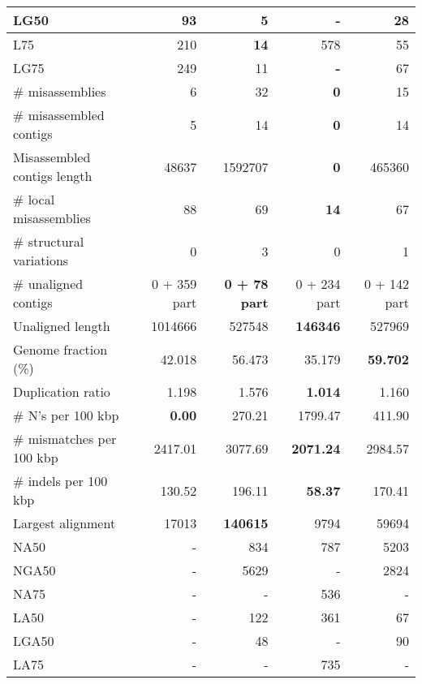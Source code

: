 \documentclass[12pt,a4paper]{article}
\begin{document}
\begin{table}[ht]
\begin{center}
\begin{tabular}{|l*{4}{|r}|}
LG50 & 93 & 5 & {\bf -} & 28 \\ \hline
L75 & 210 & {\bf 14} & 578 & 55 \\ \hline
LG75 & 249 & 11 & {\bf -} & 67 \\ \hline
\# misassemblies & 6 & 32 & {\bf 0} & 15 \\ \hline
\# misassembled contigs & 5 & 14 & {\bf 0} & 14 \\ \hline
Misassembled contigs length & 48637 & 1592707 & {\bf 0} & 465360 \\ \hline
\# local misassemblies & 88 & 69 & {\bf 14} & 67 \\ \hline
\# structural variations & 0 & 3 & 0 & 1 \\ \hline
\# unaligned contigs & 0 + 359 part & {\bf 0 + 78 part} & 0 + 234 part & 0 + 142 part \\ \hline
Unaligned length & 1014666 & 527548 & {\bf 146346} & 527969 \\ \hline
Genome fraction (\%) & 42.018 & 56.473 & 35.179 & {\bf 59.702} \\ \hline
Duplication ratio & 1.198 & 1.576 & {\bf 1.014} & 1.160 \\ \hline
\# N's per 100 kbp & {\bf 0.00} & 270.21 & 1799.47 & 411.90 \\ \hline
\# mismatches per 100 kbp & 2417.01 & 3077.69 & {\bf 2071.24} & 2984.57 \\ \hline
\# indels per 100 kbp & 130.52 & 196.11 & {\bf 58.37} & 170.41 \\ \hline
Largest alignment & 17013 & {\bf 140615} & 9794 & 59694 \\ \hline
NA50 & - & 834 & 787 & 5203 \\ \hline
NGA50 & - & 5629 & - & 2824 \\ \hline
NA75 & - & - & 536 & - \\ \hline
LA50 & - & 122 & 361 & 67 \\ \hline
LGA50 & - & 48 & - & 90 \\ \hline
LA75 & - & - & 735 & - \\ \hline
\end{tabular}
\end{center}
\end{table}
\end{document}
